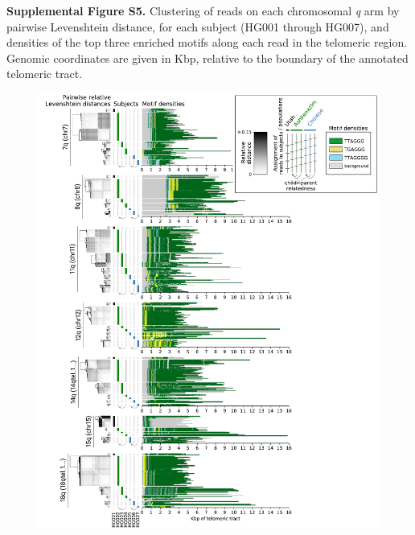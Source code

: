 \documentclass{article}
\begin{document}
\begin{samepage}

\noindent \textbf{Supplemental Figure S5.}
Clustering of reads on each chromosomal \textit{q} arm by pairwise Levenshtein distance, for each subject (HG001 through HG007), and densities of the top three enriched motifs along each read in the telomeric region.
Genomic coordinates are given in Kbp, relative to the boundary of the annotated telomeric tract.

\begin{figure}[h!] \centering
\includegraphics[width=\textwidth,keepaspectratio]{Figure_S5-nolegend.pdf}
\end{figure}

\end{samepage}
\end{document}
